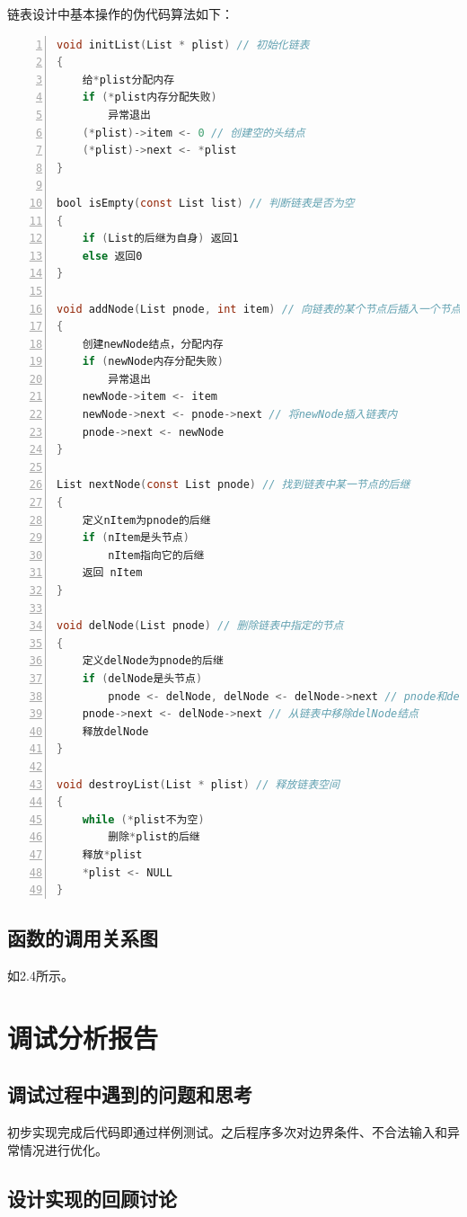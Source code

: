 \documentclass{article}
\begin{document}
链表设计中基本操作的伪代码算法如下：
\begin{lstlisting}[language={C},
    numbers=left,
    numberstyle=\tiny\consolas,
    basicstyle=\small\consolas]
void initList(List * plist) // 初始化链表
{    
    给*plist分配内存
    if (*plist内存分配失败)
        异常退出
    (*plist)->item <- 0 // 创建空的头结点
    (*plist)->next <- *plist
}

bool isEmpty(const List list) // 判断链表是否为空
{    
    if (List的后继为自身) 返回1
    else 返回0
}

void addNode(List pnode, int item) // 向链表的某个节点后插入一个节点
{    
    创建newNode结点，分配内存
    if (newNode内存分配失败)
        异常退出
    newNode->item <- item
    newNode->next <- pnode->next // 将newNode插入链表内
    pnode->next <- newNode
}

List nextNode(const List pnode) // 找到链表中某一节点的后继
{
    定义nItem为pnode的后继
    if (nItem是头节点) 
        nItem指向它的后继
    返回 nItem
}

void delNode(List pnode) // 删除链表中指定的节点
{
    定义delNode为pnode的后继
    if (delNode是头节点)
        pnode <- delNode, delNode <- delNode->next // pnode和delNode都指向他们的后继
    pnode->next <- delNode->next // 从链表中移除delNode结点
    释放delNode
}

void destroyList(List * plist) // 释放链表空间
{
    while (*plist不为空)
        删除*plist的后继
    释放*plist
    *plist <- NULL
}    
\end{lstlisting}

\subsection{函数的调用关系图}

如2.4所示。

\section{调试分析报告}

\subsection{调试过程中遇到的问题和思考}

初步实现完成后代码即通过样例测试。之后程序多次对边界条件、不合法输入和异常情况进行优化。

\subsection{设计实现的回顾讨论}
\end{document}
